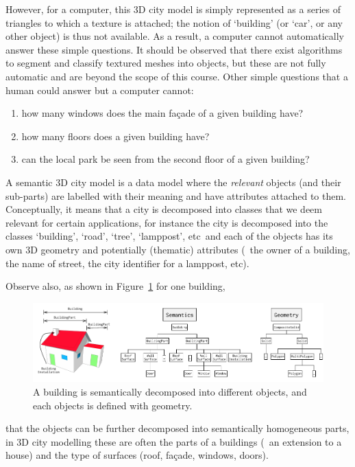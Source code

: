 However, for a computer, this 3D city model is simply represented as a series of triangles to which a texture is attached; the notion of `building' (or `car', or any other object) is thus not available.
As a result, a computer cannot automatically answer these simple questions.
It should be observed that there exist algorithms to segment and classify textured meshes into objects, but these are not fully automatic and are beyond the scope of this course.
Other simple questions that a human could answer but a computer cannot:
\begin{enumerate}
  \item how many windows does the main façade of a given building have?
  \item how many floors does a given building have?
  \item can the local park be seen from the second floor of a given building?
\end{enumerate}

%

A semantic 3D city model is a data model where the \emph{relevant} objects (and their sub-parts) are labelled with their meaning and have attributes attached to them.
Conceptually, it means that a city is decomposed into classes that we deem relevant for certain applications, for instance the city is decomposed into the classes `building', `road', `tree', `lamppost', etc\ and each of the objects has its own 3D geometry and potentially (thematic) attributes (\eg\ the owner of a building, the name of street, the city identifier for a lamppost, etc).

%

Observe also, as shown in Figure~\ref{fig:ssc} for one building, 
\begin{figure}
  \centering
  \includegraphics[width=\linewidth]{figs/ssc}
  \caption{A building is semantically decomposed into different objects, and each objects is defined with geometry.}%
\label{fig:ssc}
\end{figure}
that the objects can be further decomposed into semantically homogeneous parts, in 3D city modelling these are often the parts of a buildings (\eg\ an extension to a house) and the type of surfaces (roof, façade, windows, doors).

